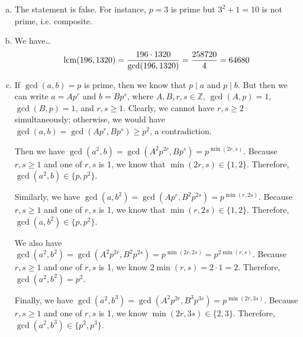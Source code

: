 \documentclass[11pt,letterpaper]{article}
\begin{document}
\sol 
\begin{enumerate}[(a)]
\item The statement is false. For instance, $p= 3$ is prime but $3^2 + 1= 10$ is not prime, i.e. composite. \pspace

\item We have\dots
	\[
	\operatorname{lcm}(196, 1320)= \dfrac{196 \cdot 1320}{\gcd(196, 1320)}= \dfrac{258720}{4}= 64680
	\] \pspace

\item If $\gcd(a, b)= p$ is prime, then we know that $p \mid a$ and $p \mid b$. But then we can write $a= Ap^r$ and $b= Bp^s$, where $A, B, r, s \in \mathbb{Z}$, $\gcd(A, p)= 1$, $\gcd(B, p)= 1$, and $r, s \geq 1$. Clearly, we cannot have $r, s \geq 2$ simultaneously; otherwise, we would have $\gcd(a, b)= \gcd(Ap^r, Bp^s) \geq p^2$, a contradiction. \pspace

Then we have $\gcd(a^2, b)= \gcd(A^2 p^{2r}, Bp^s)= p^{\min(2r, s)}$. Because $r, s \geq 1$ and one of $r, s$ is 1, we know that $\min(2r, s) \in \{ 1, 2\}$. Therefore, $\gcd(a^2, b) \in \{ p, p^2 \}$. \pspace

Similarly, we have $\gcd(a, b^2)= \gcd(A p^r, B^2p^{2s})= p^{\min(r, 2s)}$. Because $r, s \geq 1$ and one of $r, s$ is 1, we know that $\min(r, 2s) \in \{ 1, 2\}$. Therefore, $\gcd(a, b^2) \in \{ p, p^2 \}$. \pspace

We also have $\gcd(a^2, b^2)= \gcd(A^2 p^{2r}, B^2 p^{2s})= p^{\min(2r, 2s)}= p^{2 \min(r, s)}$. Because $r, s \geq 1$ and one of $r, s$ is 1, we know $2 \min(r, s)= 2 \cdot 1= 2$. Therefore, $\gcd(a^2, b^2)= p^2$. \pspace

Finally, we have $\gcd(a^2, b^3)= \gcd(A^2 p^{2r}, B^3 p^{3s})= p^{\min(2r, 3s)}$. Because $r, s \geq 1$ and one of $r, s$ is 1, we know $\min(2r, 3s) \in \{ 2, 3 \}$. Therefore, $\gcd(a^2, b^3) \in \{ p^2, p^3 \}$. 
\end{enumerate}
\end{document}

